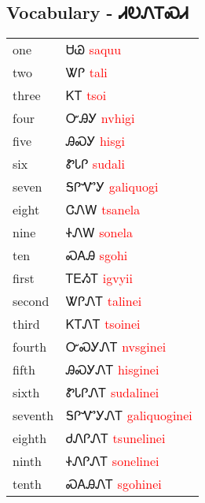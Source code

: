 {{{\subsection{Vocabulary - ᏗᎧᏁᎢᏍᏗ 
}
\begin{tabular}{p{3cm} p{11cm}}
one & ᏌᏊ 
 \newline \textcolor{red}{saquu}\\
two & ᏔᎵ 
 \newline \textcolor{red}{tali}\\
three & ᏦᎢ 
 \newline \textcolor{red}{tsoi}\\
four & ᏅᎯᎩ 
 \newline \textcolor{red}{nvhigi}\\
five & ᎯᏍᎩ 
 \newline \textcolor{red}{hisgi}\\
six & ᏑᏓᎵ 
 \newline \textcolor{red}{sudali}\\
seven & ᎦᎵᏉᎩ 
 \newline \textcolor{red}{galiquogi}\\
eight & ᏣᏁᎳ 
 \newline \textcolor{red}{tsanela}\\
nine & ᏐᏁᎳ 
 \newline \textcolor{red}{sonela}\\
ten & ᏍᎪᎯ 
 \newline \textcolor{red}{sgohi}\\
first & ᎢᎬᏱᎢ 
 \newline \textcolor{red}{igvyii}\\
second & ᏔᎵᏁᎢ 
 \newline \textcolor{red}{talinei}\\
third & ᏦᎢᏁᎢ 
 \newline \textcolor{red}{tsoinei}\\
fourth & ᏅᏍᎩᏁᎢ 
 \newline \textcolor{red}{nvsginei}\\
fifth & ᎯᏍᎩᏁᎢ 
 \newline \textcolor{red}{hisginei}\\
sixth & ᏑᏓᎵᏁᎢ 
 \newline \textcolor{red}{sudalinei}\\
seventh & ᎦᎵᏉᎩᏁᎢ 
 \newline \textcolor{red}{galiquoginei}\\
eighth & ᏧᏁᎵᏁᎢ 
 \newline \textcolor{red}{tsunelinei}\\
ninth & ᏐᏁᎵᏁᎢ 
 \newline \textcolor{red}{sonelinei}\\
tenth & ᏍᎪᎯᏁᎢ 
 \newline \textcolor{red}{sgohinei}\\
\end{tabular}

}}}
